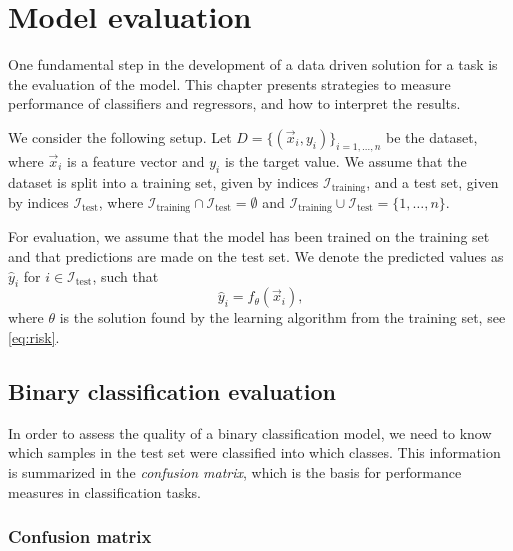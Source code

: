 \chapter{Model evaluation}
\label{chap:evaluation}


One fundamental step in the development of a data driven solution for a task is the
evaluation of the model. This chapter presents strategies to measure performance of
classifiers and regressors, and how to interpret the results.

We consider the following setup.  Let $D = \{(\vec{x}_i, y_i)\}_{i=1,\dots,n}$ be the
dataset, where $\vec{x}_i$ is a feature vector and $y_i$ is the target value.  We assume
that the dataset is split into a training set, given by indices
$\mathcal{I}_\text{training}$, and a test set, given by indices $\mathcal{I}_\text{test}$,
where $\mathcal{I}_\text{training} \cap \mathcal{I}_\text{test} = \emptyset$ and
$\mathcal{I}_\text{training} \cup \mathcal{I}_\text{test} = \{1,\dots,n\}$.

For evaluation, we assume that the model has been trained on the training set and that
predictions are made on the test set.  We denote the predicted values as $\hat{y}_i$ for
$i \in \mathcal{I}_\text{test}$, such that
\begin{equation*}
  \hat{y}_i = f_\theta(\vec{x}_i)\text{,}
\end{equation*}
where $\theta$ is the solution found by the learning algorithm from the training set, see
\cref{eq:risk}.

\section{Binary classification evaluation}

In order to assess the quality of a binary classification model, we need to know which
samples in the test set were classified into which classes.  This information is
summarized in the \emph{confusion matrix}, which is the basis for performance measures in
classification tasks.

\subsection{Confusion matrix}

